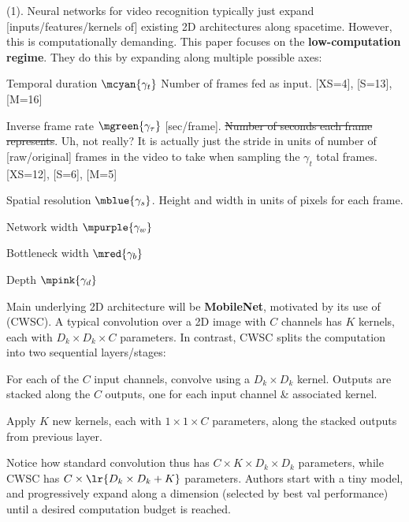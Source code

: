\documentclass[11pt]{article}
\begin{document}
 (1). Neural networks for video recognition typically just expand [inputs/features/kernels of] existing 2D architectures along spacetime. However, this is computationally demanding. This paper focuses on the \textbf{low-computation regime}. They do this by expanding along multiple possible axes:
\begin{compactitem}
	\item Temporal duration $\mcyan{\gamma_t}$ Number of frames fed as input. [XS=4], [S=13], [M=16]
	
	\item Inverse frame rate $\mgreen{\gamma_{\tau}}$ [sec/frame]. \sout{Number of seconds each frame represents}. Uh, not really? It is actually just the stride in units of number of [raw/original] frames in the video to take when sampling the $\gamma_t$ total frames. [XS=12], [S=6], [M=5]
	
	\item Spatial resolution $\mblue{\gamma_s}$. Height and width in units of pixels for each frame. 
	
	\item Network width $\mpurple{\gamma_w}$
	
	\item Bottleneck width $\mred{\gamma_b}$
	
	\item Depth $\mpink{\gamma_d}$
\end{compactitem}

Main underlying 2D architecture will be \textbf{MobileNet}, motivated by its use of  (CWSC). A typical convolution over a 2D image with $C$ channels has $K$ kernels, each with $D_k \times D_k \times C$ parameters. In contrast, CWSC splits the computation into two sequential layers/stages:
\begin{compactenum}
	\item For each of the $C$ input channels, convolve using a $D_k \times D_k$ kernel. Outputs are stacked along the $C$ outputs, one for each input channel \& associated kernel. 
	
	\item Apply $K$ new kernels, each with $1 \times 1 \times C$ parameters, along the stacked outputs from previous layer. 
\end{compactenum}

Notice how standard convolution thus has $C \times K \times D_k \times D_k $ parameters, while CWSC has $C \times \lr{ D_k \times D_k + K}$ parameters. Authors start with a tiny model, and progressively expand along a dimension (selected by best val performance) until a desired computation budget is reached. 
\end{document}
